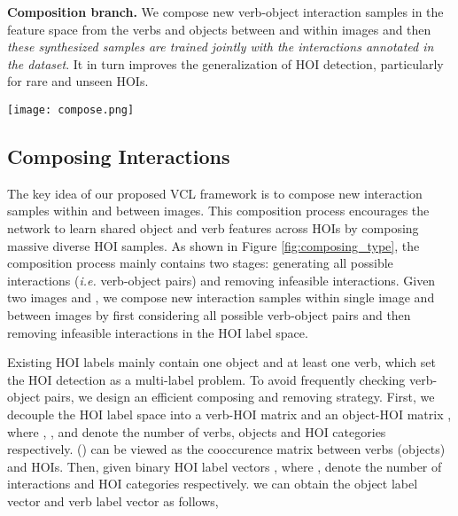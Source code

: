 \documentclass[runningheads]{llncs}
\newcommand{\ie}{\textit{i.e. }}
\begin{document}
\textbf{Composition branch.} We compose new verb-object interaction samples in the feature space from the verbs and objects between and within images and then \textit{these synthesized samples are trained jointly with the interactions annotated in the dataset}. It in turn improves the generalization of HOI detection, particularly for rare and unseen HOIs.



\begin{figure*}[t]
\begin{center}
\texttt{[image: compose.png]}
\end{center}
   \caption{Illustration of the process of composing new interactions. Given two images  and , we compose new interaction samples within single image and between them by first considering all possible verb-object pairs and then removing infeasible interactions}
\label{fig:composing_type}
\end{figure*}

\subsection{Composing Interactions}
The key idea of our proposed VCL framework is to compose new interaction samples within and between images. This composition process encourages the network to learn shared object and verb features across HOIs by composing massive diverse HOI samples. As shown in Figure \ref{fig:composing_type}, the composition process mainly contains two stages: generating all possible interactions (\ie verb-object pairs) and removing infeasible interactions.
Given two images  and , we compose new interaction samples within single image and between images by first considering all possible verb-object pairs and then removing infeasible interactions in the HOI label space.

Existing HOI labels mainly contain one object and at least one verb, which set the HOI detection as a multi-label problem. To avoid frequently checking verb-object pairs, we design an efficient composing and removing strategy. First, we decouple the HOI label space into a verb-HOI  matrix  and an object-HOI matrix , where , , and  denote the number of verbs, objects and HOI categories respectively.  () can be viewed as the cooccurence matrix between verbs (objects) and HOIs. Then, given binary HOI label vectors , where ,  denote the number of interactions and HOI categories respectively. we can obtain the object label vector and verb label vector as follows,
\end{document}
